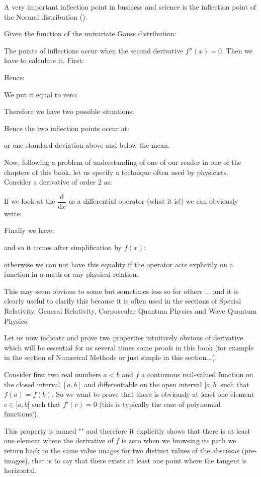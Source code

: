 	A very important inflection point in business and science is the inflection point of the Normal distribution ().
	
	Given the function of the univariate Gauss distribution:
	
	The points of inflections occur when the second derivative $f''(x)=0$. Then we have to calculate it. First:
	
	Hence:
	
	We put it equal to zero:
	
	Therefore we have two possible situations:
	
	Hence the two inflection points occur at:
	
	or one standard deviation above and below the mean.

Now, following a problem of understanding of one of our reader in one of the chapters of this book, let us specify a technique often used by physicists. Consider a derivative of order $2$ as:
	
If we look at the $\dfrac{\mathrm{d}}{\mathrm{d}x}$ as a differential operator (what it is!) we can obviously write:
	
Finally we have:
	
and so it comes after simplification by $f(x)$:
	
otherwise we can not have this equality if the operator acts explicitly on a function in a math or any physical relation.

This may seem obvious to some but sometimes less so for others ... and it is clearly useful to clarify this because it is often used in the sections of Special Relativity, General Relativity, Corpuscular Quantum Physics and Wave Quantum Physics.

Let us now indicate and prove two properties intuitively obvious of derivative which will be essential for us several times some proofs in this book (for example in the section of Numerical Methods or just simple in this section...).

\begin{theorem}
Consider first two real numbers $a<b$ and $f$ a continuous real-valued function on the closed interval $[a, b]$ and differentiable on the open interval $]a, b[$ such that $f(a)=f(b)$. So we want to prove that there is obviously  at least one element $c \in ]a, b[$ such that $f'(c)=0$ (this is typically the case of polynomial functions!).

This property is named "\label{rolle theorem}" and therefore it explicitly shows that there is at least one element where the derivative of $f$ is zero when we browsing its path we return back to the same value images for two distinct values of the abscissas (pre-images), that is to say that there exists at least one point where the tangent is horizontal.
\end{theorem}


